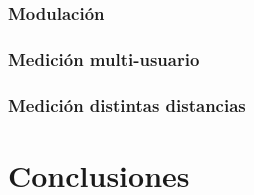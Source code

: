 \documentclass[12pt,twoside,openright]{moddalthesis}
\begin{document}
\subsubsection{Modulación}
\subsubsection{Medición multi-usuario}
\subsubsection{Medición distintas distancias}

\section{Conclusiones}

%


\end{document}
